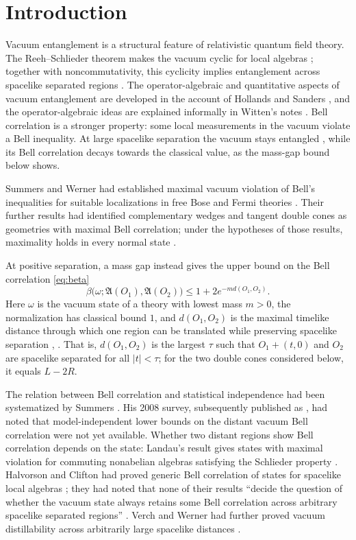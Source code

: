 \documentclass[11pt]{amsart}
\numberwithin{equation}{section}
\theoremstyle{definition}
\newcommand{\A}{\mathfrak A}
\begin{document}
{\small\tableofcontents}

\section{Introduction}

Vacuum entanglement is a structural feature of relativistic quantum field
theory. The Reeh--Schlieder theorem makes the vacuum cyclic for local
algebras \cite{RS61}; together with noncommutativity, this cyclicity implies
entanglement across spacelike separated regions \cite{HC00}.
The operator-algebraic and quantitative aspects of vacuum entanglement
are developed in the account of Hollands and Sanders \cite{HS18}, and
the operator-algebraic ideas are explained informally in Witten's notes
\cite{Witten18}. Bell
correlation is a stronger property: some local measurements in the vacuum
violate a Bell inequality. At large spacelike separation the vacuum stays
entangled \cite{HC00,VW05}, while its Bell correlation decays towards the
classical value, as the mass-gap bound below shows.

Summers and Werner had established maximal vacuum violation of Bell's
inequalities for suitable localizations in free Bose and Fermi theories
\cite{SW85,SW87b}. Their further results had identified complementary wedges
and tangent double cones as geometries with maximal Bell correlation;
under the hypotheses of those results, maximality holds in every normal
state \cite{SW87c,SW88}.

At positive separation, a mass gap instead gives
the upper bound on the Bell correlation \eqref{eq:beta}
\[
 \beta\bigl(\omega;\A(O_1),\A(O_2)\bigr)
 \le 1+2e^{-m d(O_1,O_2)}.
\]
Here \(\omega\) is the vacuum state of a theory with lowest mass \(m>0\),
the normalization has classical bound \(1\), and
\(d(O_1,O_2)\) is the maximal timelike distance through which one region
can be translated while preserving spacelike separation
\cite{SW87a}, \cite[Proposition~4.5]{Summers11}. That is, \(d(O_1,O_2)\) is the largest
\(\tau\) such that \(O_1+(t,0)\) and \(O_2\) are spacelike separated for
all \(|t|<\tau\); for the two double cones considered below, it equals
\(L-2R\).

The relation between Bell correlation and statistical independence had been
systematized by Summers \cite{Summers90}. His 2008 survey, subsequently
published as \cite{Summers11}, had noted that model-independent lower
bounds on the distant vacuum Bell correlation were not yet available. Whether two distant regions show Bell correlation depends on the state: Landau's
result gives states with maximal violation for commuting nonabelian
algebras satisfying the Schlieder property \cite{Landau87}.
Halvorson and Clifton had proved generic Bell correlation of states for
spacelike local algebras \cite{HC00}; they had noted that none of their results ``decide the question of
whether the vacuum state always retains some Bell correlation across
arbitrary spacelike separated regions'' \cite[Section~IV]{HC00}. Verch and Werner had further proved vacuum
distillability across arbitrarily large spacelike distances
\cite{VW05}.
\end{document}
